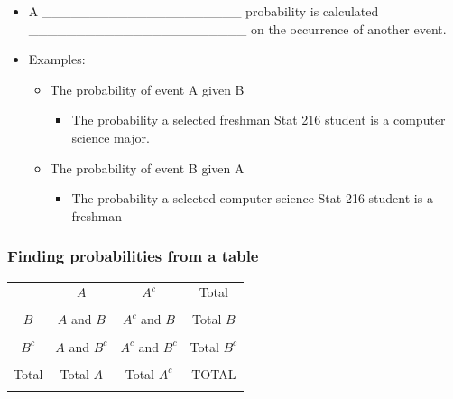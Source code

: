 \documentclass[
]{report}
\providecommand{\tightlist}{%
  \setlength{\itemsep}{0pt}\setlength{\parskip}{0pt}}
\begin{document}
\begin{itemize}
  \begin{itemize}
  \item
    A \_\_\_\_\_\_\_\_\_\_\_\_\_\_\_\_\_\_\_\_\_ probability is calculated
    \_\_\_\_\_\_\_\_\_\_\_\_\_\_\_\_\_\_\_\_\_\_\_ on the occurrence of another event.
  \item
    Examples:

    \begin{itemize}
    \item
      The probability of event A given B

      \begin{itemize}
      \tightlist
      \item
        The probability a selected freshman Stat 216 student is a computer science major.
      \end{itemize}
    \item
      The probability of event B given A

      \begin{itemize}
      \tightlist
      \item
        The probability a selected computer science Stat 216 student is a freshman
      \end{itemize}
    \end{itemize}
  \end{itemize}
\end{itemize}


\hypertarget{finding-probabilities-from-a-table}{%
\subsubsection*{Finding probabilities from a table}\label{finding-probabilities-from-a-table}}

\begin{center}
\begin{tabular}{|c|c|c|c|} \hline
\hspace{0.8in} & \hspace{0.35in} $A$ \hspace{.35in} & \hspace{0.35in} $A^c$  \hspace{0.35in} & \hspace{0.3in} Total \hspace{0.3in} \\ 
& & & \\ \hline
$B$& $A$ and $B$ & $A^c$ and $B$ & Total $B$ \\ 
& & & \\ \hline
$B^c$& $A$ and $B^c$ & $A^c$ and $B^c$ & Total $B^c$ \\ 
& & & \\ \hline
Total & Total $A$ & Total $A^c$ & TOTAL \\ 
& & & \\ \hline
\end{tabular}
\end{center}
\vspace{.1in}
\end{document}
